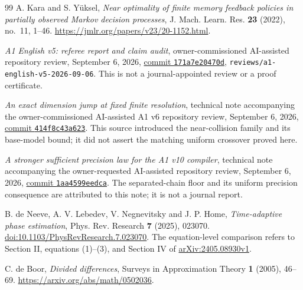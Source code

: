 \begin{thebibliography}{99}
A. Kara and S. Y\"uksel, \emph{Near optimality of finite memory feedback
policies in partially observed Markov decision processes}, J. Mach. Learn.
Res. \textbf{23} (2022), no.~11, 1--46.
\url{https://jmlr.org/papers/v23/20-1152.html}.

\emph{A1 English v5: referee report and claim audit}, owner-commissioned
AI-assisted repository review, September 6, 2026,
\href{https://github.com/TrillionniumFoundation/theta-theory/tree/171a7e20470d7e83a5b6b614f60a3434fd3145d7/reviews/a1-english-v5-2026-09-06}{commit \texttt{171a7e20470d}},
\texttt{reviews/a1-english-v5-2026-09-06}. This is not a journal-appointed
review or a proof certificate.

\emph{An exact dimension jump at fixed finite resolution}, technical note
accompanying the owner-commissioned AI-assisted A1 v6 repository review,
September 6, 2026,
\href{https://github.com/TrillionniumFoundation/theta-theory/blob/414f8c43a6236586362c1532c00aa9b9da01fe64/reviews/a1-english-v6-2026-09-06/TECHNICAL_NOTE.md}{commit \texttt{414f8c43a623}}.
This source introduced the near-collision family and its base-model bound;
it did not assert the matching uniform crossover proved here.

\emph{A stronger sufficient precision law for the A1 v10 compiler},
technical note accompanying the owner-requested AI-assisted repository
review, September 6, 2026,
\href{https://github.com/TrillionniumFoundation/theta-theory/blob/1aa4599eedca650d34c3778a00f3ad854c2bc9d7/reviews/a1-english-v10-effective-finite-memory-2026-09-06/TECHNICAL_NOTE.md}{commit \texttt{1aa4599eedca}}.
The separated-chain floor and its uniform precision consequence are
attributed to this note; it is not a journal report.

B. de Neeve, A. V. Lebedev, V. Negnevitsky and J. P. Home,
\emph{Time-adaptive phase estimation}, Phys. Rev. Research
\textbf{7} (2025), 023070.
\href{https://doi.org/10.1103/PhysRevResearch.7.023070}{doi:10.1103/PhysRevResearch.7.023070}.
The equation-level comparison refers to Section II, equations (1)--(3),
and Section IV of \href{https://arxiv.org/html/2405.08930v1}{arXiv:2405.08930v1}.

C. de Boor, \emph{Divided differences}, Surveys in Approximation Theory
\textbf{1} (2005), 46--69. \url{https://arxiv.org/abs/math/0502036}.


\end{thebibliography}
